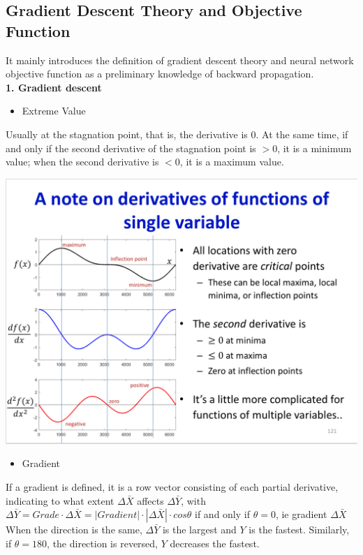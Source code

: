 \documentclass{article}
\begin{document}
	
	\subsection{Gradient Descent Theory and Objective Function}
	
	It mainly introduces the definition of gradient descent theory and neural network objective function as a preliminary knowledge of backward propagation. \\ 
	
	\textbf{1. Gradient descent}
	
	\begin{itemize}
		\item Extreme Value
	\end{itemize}

	Usually at the stagnation point, that is, the derivative is 0. At the same time, if and only if the second derivative of the stagnation point is $>0$, it is a minimum value; when the second derivative is $<0$, it is a maximum value.
	
	\includegraphics[scale=0.2]{57.png}
    
	
	\begin{itemize}
		\item Gradient
	\end{itemize}
	
	If a gradient is defined, it is a row vector consisting of each partial derivative, indicating to what extent $\Delta{\bar{X}}$ affects $\Delta{\bar{Y}}$, with $\Delta{\bar{Y}}=Grade·\Delta{\bar{X}}=|Gradient|·|\Delta{\bar{X}}|·cos\theta$ if and only if $\theta=0$, ie gradient $\Delta{\bar{X}}$ When the direction is the same, $\Delta{\bar{Y}}$ is the largest and $Y$ is the fastest. Similarly, if $\theta=180$, the direction is reversed, $Y$ decreases the fastest.
	
\end{document}
